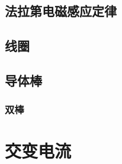 \documentclass[cn,blue,11pt,normal]{elegantnote}
\begin{document}
\subsection{法拉第电磁感应定律}
\begin{proset}
	
\end{proset}

\begin{proset}
	
\end{proset}
\begin{proset}
	
\end{proset}

\subsection{线圈}
\begin{proset}
	
\end{proset}

\subsection{导体棒}
\begin{proset}
	
\end{proset}

\subsubsection{双棒}
\begin{proset}
	
\end{proset}
\begin{proset}
	
\end{proset}


\newpage
\section{交变电流}


\begin{proset}
	
\end{proset}
\begin{proset}
	
\end{proset}
\end{document}
